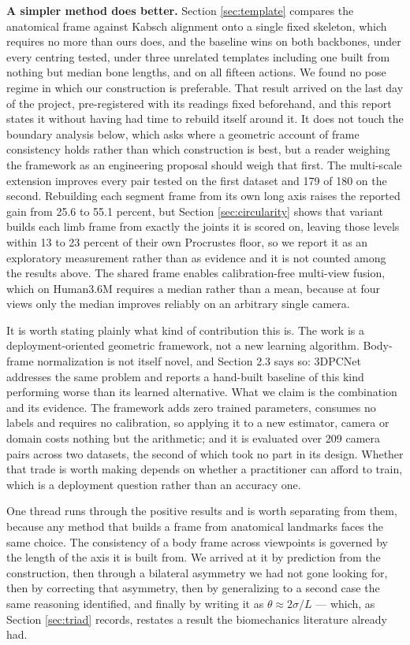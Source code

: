 \documentclass[12pt,a4paper]{report}
\begin{document}
\textbf{A simpler method does better.} Section \ref{sec:template} compares the anatomical frame against Kabsch alignment onto a single fixed skeleton, which requires no more than ours does, and the baseline wins on both backbones, under every centring tested, under three unrelated templates including one built from nothing but median bone lengths, and on all fifteen actions. We found no pose regime in which our construction is preferable. That result arrived on the last day of the project, pre-registered with its readings fixed beforehand, and this report states it without having had time to rebuild itself around it. It does not touch the boundary analysis below, which asks where a geometric account of frame consistency holds rather than which construction is best, but a reader weighing the framework as an engineering proposal should weigh that first. The multi-scale extension improves every pair tested on the first dataset and 179 of 180 on the second. Rebuilding each segment frame from its own long axis raises the reported gain from 25.6 to 55.1 percent, but Section \ref{sec:circularity} shows that variant builds each limb frame from exactly the joints it is scored on, leaving those levels within 13 to 23 percent of their own Procrustes floor, so we report it as an exploratory measurement rather than as evidence and it is not counted among the results above. The shared frame enables calibration-free multi-view fusion, which on Human3.6M requires a median rather than a mean, because at four views only the median improves reliably on an arbitrary single camera.

It is worth stating plainly what kind of contribution this is. The work is a deployment-oriented geometric framework, not a new learning algorithm. Body-frame normalization is not itself novel, and Section 2.3 says so: 3DPCNet addresses the same problem and reports a hand-built baseline of this kind performing worse than its learned alternative. What we claim is the combination and its evidence. The framework adds zero trained parameters, consumes no labels and requires no calibration, so applying it to a new estimator, camera or domain costs nothing but the arithmetic; and it is evaluated over 209 camera pairs across two datasets, the second of which took no part in its design. Whether that trade is worth making depends on whether a practitioner can afford to train, which is a deployment question rather than an accuracy one.

One thread runs through the positive results and is worth separating from them, because any method that builds a frame from anatomical landmarks faces the same choice. The consistency of a body frame across viewpoints is governed by the length of the axis it is built from. We arrived at it by prediction from the construction, then through a bilateral asymmetry we had not gone looking for, then by correcting that asymmetry, then by generalizing to a second case the same reasoning identified, and finally by writing it as $\theta \approx 2\sigma/L$ --- which, as Section \ref{sec:triad} records, restates a result the biomechanics literature already had.
\end{document}
